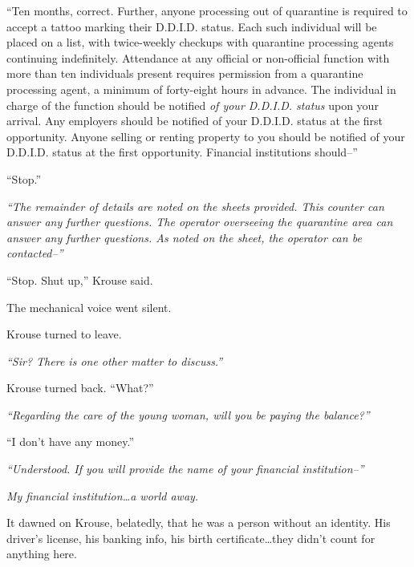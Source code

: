 ``Ten months, correct.  Further, anyone processing out of quarantine is required to accept a tattoo marking their D.D.I.D. status.  Each such individual will be placed on a list, with twice-weekly checkups with quarantine processing agents continuing indefinitely.  Attendance at any official or non-official function with more than ten individuals present requires permission from a quarantine processing agent, a minimum of forty-eight hours in advance.  The individual in charge of the function should be notified \emph{of your D.D.I.D. status} upon your arrival.  Any employers should be notified of your D.D.I.D. status at the first opportunity.  Anyone selling or renting property to you should be notified of your D.D.I.D. status at the first opportunity.  Financial institutions should--''



``Stop.''



\emph{``The remainder of details are noted on the sheets provided.  This counter can answer any further questions.  The operator overseeing the quarantine area can answer any further questions.  As noted on the sheet, the operator can be contacted--''}



``Stop.  Shut up,'' Krouse said.



The mechanical voice went silent.



Krouse turned to leave.



\emph{``Sir?  There is one other matter to discuss.''}



Krouse turned back.  ``What?''



\emph{``Regarding the care of the young woman, will you be paying the balance?''}



``I don't have any money.''



\emph{``Understood.  If you will provide the name of your financial institution--''}



\emph{My financial institution\ldots a world away.}



It dawned on Krouse, belatedly, that he was a person without an identity.  His driver's license, his banking info, his birth certificate\ldots they didn't count for anything here.



